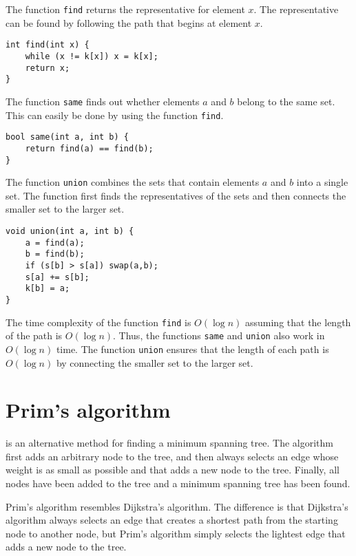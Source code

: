 The function \texttt{find} returns
the representative for element $x$.
The representative can be found by following
the path that begins at element $x$.

\begin{lstlisting}
int find(int x) {
    while (x != k[x]) x = k[x];
    return x;
}
\end{lstlisting}

The function \texttt{same} finds out
whether elements $a$ and $b$ belong to the same set.
This can easily be done by using the
function \texttt{find}.

\begin{lstlisting}
bool same(int a, int b) {
    return find(a) == find(b);
}
\end{lstlisting}

\begin{samepage}
The function \texttt{union} combines the sets
that contain elements $a$ and $b$
into a single set.
The function first finds the representatives
of the sets and then connects the smaller
set to the larger set.

\begin{lstlisting}
void union(int a, int b) {
    a = find(a);
    b = find(b);
    if (s[b] > s[a]) swap(a,b);
    s[a] += s[b];
    k[b] = a;
}
\end{lstlisting}
\end{samepage}

The time complexity of the function \texttt{find}
is $O(\log n)$ assuming that the length of the
path is $O(\log n)$.
Thus, the functions \texttt{same} and \texttt{union}
also work in $O(\log n)$ time.
The function \texttt{union} ensures that the
length of each path is $O(\log n)$ by connecting
the smaller set to the larger set.

\section{Prim's algorithm}


 is an alternative method
for finding a minimum spanning tree.
The algorithm first adds an arbitrary node
to the tree, and then always selects an edge
whose weight is as small as possible and
that adds a new node to the tree.
Finally, all nodes have been added to the tree
and a minimum spanning tree has been found.

Prim's algorithm resembles Dijkstra's algorithm.
The difference is that Dijkstra's algorithm always
selects an edge that creates a shortest path
from the starting node to another node,
but Prim's algorithm simply selects the lightest
edge that adds a new node to the tree.

